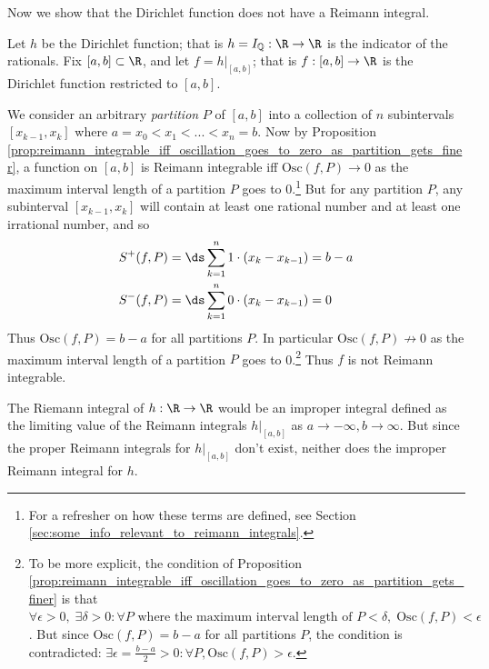 \documentclass{article} %
\renewcommand{\Q}{\mathbb{Q}}
\begin{document}
Now we show that the Dirichlet function does not have a Reimann integral. 

\begin{remark}{}	
Let $h$ be the Dirichlet function; that is $h = I_{\Q} : \R \to \R$ is the indicator of the rationals.  Fix $[a,b] \subset \R$, and let $f=h |_{[a,b]}$; that is $f : [a,b] \to \R$ is the Dirichlet function restricted to $[a,b]$.  

We consider an arbitrary \textit{partition} $P$ of $[a,b]$ into a collection of $n$ subintervals $[x_{k-1}, x_k]$ where $a=x_0 < x_1 < ... < x_n = b$.  Now by Proposition \ref{prop:reimann_integrable_iff_oscillation_goes_to_zero_as_partition_gets_finer}, a function on $[a,b]$ is Reimann integrable iff $\text{Osc}(f,P) \to 0$ as the maximum interval length of a partition $P$ goes to 0.\footnote{For a refresher on how these terms are defined, see Section \ref{sec:some_info_relevant_to_reimann_integrals}.}  But for any partition $P$, any subinterval $[x_{k-1}, x_k]$ will contain at least one rational number and at least one irrational number, and so
\begin{align*}
S^+(f,P) &= \ds\sum_{k=1}^n 1 \cdot (x_k - x_{k-1}) = b-a \\	
S^-(f,P) &= \ds\sum_{k=1}^n 0 \cdot (x_k - x_{k-1}) = 0\\
\end{align*}
Thus $\text{Osc}(f,P) = b-a$ for all partitions $P$. In particular $\text{Osc}(f,P) \not\to 0$ 	as the maximum interval length of a partition $P$ goes to 0.\footnote{To be more explicit, the condition of Proposition \ref{prop:reimann_integrable_iff_oscillation_goes_to_zero_as_partition_gets_finer} is that $\forall \epsilon > 0, \;\exists \delta >0  : \forall P  \text{ where the maximum interval length of } P < \delta, \; \text{Osc}(f,P) < \epsilon$. But since $\text{Osc}(f,P) = b-a$ for all partitions $P$, the condition is contradicted: $\exists \epsilon = \frac{b-a}{2} >0 : \forall P, \text{Osc}(f,P) > \epsilon.$}  Thus $f$ is not Reimann integrable. 

The Riemann integral of $h: \R \to \R$ would be an improper integral defined as the limiting value of the Reimann integrals $h|_{[a,b]}$ as $a \to -\infty, b \to \infty$.  But since the proper Reimann integrals for $h|_{[a,b]}$ don't exist, neither does the improper Reimann integral for $h$. 
\label{rk:dirichlet_function_is_not_reimann_integrable}
\end{remark}
\end{document}
